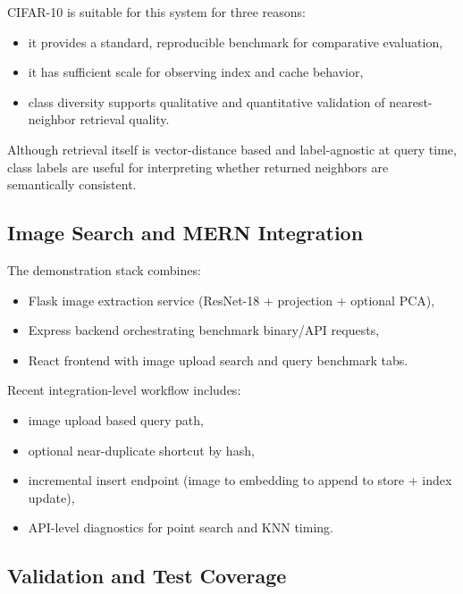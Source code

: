 \documentclass[11pt,a4paper]{article}
\begin{document}
CIFAR-10 is suitable for this system for three reasons:

\begin{itemize}[leftmargin=1.5em]
  \item it provides a standard, reproducible benchmark for comparative evaluation,
  \item it has sufficient scale for observing index and cache behavior,
  \item class diversity supports qualitative and quantitative validation of nearest-neighbor retrieval quality.
\end{itemize}

Although retrieval itself is vector-distance based and label-agnostic at query time, class labels are useful for interpreting whether returned neighbors are semantically consistent.

\subsection{Image Search and MERN Integration}

The demonstration stack combines:

\begin{itemize}[leftmargin=1.5em]
  \item Flask image extraction service (ResNet-18 + projection + optional PCA),
  \item Express backend orchestrating benchmark binary/API requests,
  \item React frontend with image upload search and query benchmark tabs.
\end{itemize}

Recent integration-level workflow includes:

\begin{itemize}[leftmargin=1.5em]
  \item image upload based query path,
  \item optional near-duplicate shortcut by hash,
  \item incremental insert endpoint (image to embedding to append to store + index update),
  \item API-level diagnostics for point search and KNN timing.
\end{itemize}

\subsection{Validation and Test Coverage}
\end{document}
